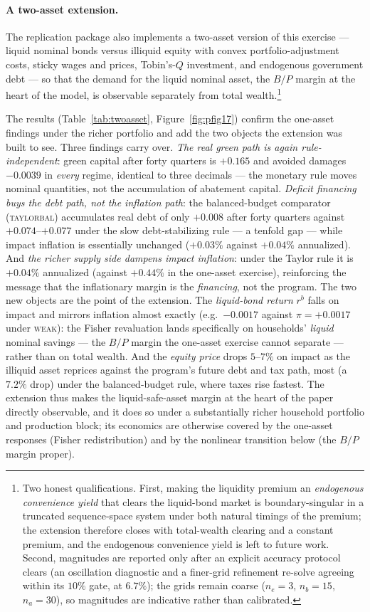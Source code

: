 \documentclass[12pt]{article}
\begin{document}
\paragraph{A two-asset extension.}\label{subsec:twoasset} The replication
package also implements a
two-asset version of this exercise --- liquid nominal bonds versus illiquid
equity with convex portfolio-adjustment costs, sticky wages and prices,
Tobin's-$Q$ investment, and endogenous government debt --- so that the
demand for the liquid nominal asset, the $B/P$ margin at the heart of the
model, is observable separately from total wealth.\footnote{Two honest
qualifications. First, making the liquidity premium an \emph{endogenous
convenience yield} that clears the liquid-bond market is boundary-singular
in a truncated sequence-space system under both natural timings of the
premium; the extension therefore closes with total-wealth clearing and a
constant premium, and the endogenous convenience yield is left to future
work. Second, magnitudes are reported only after an explicit accuracy
protocol clears (an oscillation diagnostic and a finer-grid refinement
re-solve agreeing within its $10\%$ gate, at $6.7\%$); the grids remain
coarse ($n_e=3$, $n_b=15$, $n_a=30$), so magnitudes are indicative rather
than calibrated.}

The results (Table~\ref{tab:twoasset}, Figure~\ref{fig:pfig17}) confirm the
one-asset findings under the richer portfolio and add the two objects the
extension was built to see. Three findings carry over. \emph{The real green
path is again rule-independent}: green capital after forty quarters is
$+0.165$ and avoided damages $-0.0039$ in \emph{every} regime, identical to
three decimals --- the monetary rule moves nominal quantities, not the
accumulation of abatement capital. \emph{Deficit financing buys the debt
path, not the inflation path}: the balanced-budget comparator
(\textsc{taylorbal}) accumulates real debt of only $+0.008$ after forty
quarters against $+0.074$--$+0.077$ under the slow debt-stabilizing rule ---
a tenfold gap --- while impact inflation is essentially unchanged
($+0.03\%$ against $+0.04\%$ annualized). And \emph{the richer supply side
dampens impact inflation}: under the Taylor rule it is $+0.04\%$ annualized
(against $+0.44\%$ in the one-asset exercise), reinforcing the message that
the inflationary margin is the \emph{financing}, not the program. The two
new objects are the point of the extension. The \emph{liquid-bond return}
$r^b$ falls on impact and mirrors inflation almost exactly (e.g.\ $-0.0017$
against $\pi=+0.0017$ under \textsc{weak}): the Fisher revaluation lands
specifically on households' \emph{liquid} nominal savings --- the $B/P$
margin the one-asset exercise cannot separate --- rather than on total
wealth. And the \emph{equity price} drops $5$--$7\%$ on impact as the
illiquid asset reprices against the program's future debt and tax path,
most (a $7.2\%$ drop) under the balanced-budget rule, where taxes rise
fastest. The extension thus makes the liquid-safe-asset margin at the heart
of the paper directly observable, and it does so under a substantially
richer household portfolio and production block; its economics are otherwise
covered by the one-asset responses (Fisher redistribution) and by the
nonlinear transition below (the $B/P$ margin proper).
\end{document}

